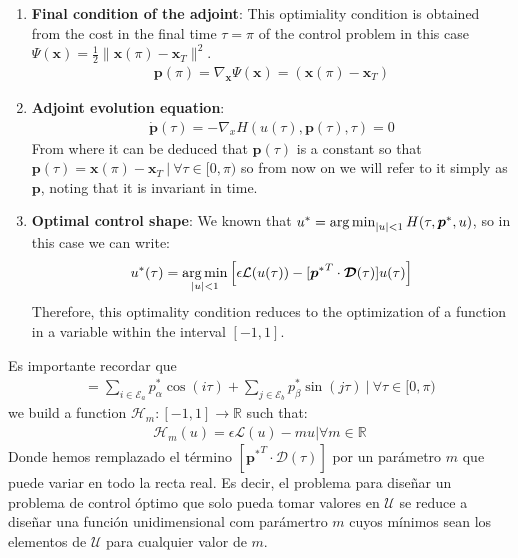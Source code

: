 \begin{enumerate}

    \item \textbf{Final condition of the adjoint}: This optimiality condition is obtained from the cost in the final time $\tau = \pi$ of the control problem in this case $ \Psi (\bm{x}) = \frac {1}{2} \| \bm{x} (\pi) - \bm{x}_T \|^2 $.
    \begin{gather}
        \bm{p}(\pi) = \nabla_{\bm{x}} \Psi(\bm{x}) =  (\bm{x} (\pi) - \bm{x}_T)
    \end{gather}
    \item \textbf{Adjoint evolution equation}: 
    \begin{gather}
        \dot{\bm{p}}(\tau) = -\nabla_x H(u(\tau),\bm{p}(\tau),\tau) = 0
    \end{gather}
    From where it can be deduced that $ \bm {p} (\tau)$ is a constant so that $ \bm {p} (\tau) = \bm {x} (\pi) - \bm { x} _T \ | \ \forall \tau \in [0, \pi) $ so from now on we will refer to it simply as $ \bm {p} $, noting that it is invariant in time.
    \item \textbf{Optimal control shape}: We known that $ u^* = \operatorname*{arg\,min}_{|u|<1} H(\tau,\bm{p}^*,u)$, so in this case we can write:
    \begin{gather}
        u^*(\tau) = \operatorname*{arg\,min}_{|u|<1}  \Big[   \epsilon \mathcal{L}(u(\tau)) -
        [{\bm{p}^*}^T \cdot \bm{\mathcal{D}}(\tau)]
        u(\tau) \Big]
    \end{gather}
    Therefore, this optimality condition reduces to the optimization of a function in a variable within the interval $ [- 1,1] $. 
\end{enumerate}
%
Es importante recordar que 
    \begin{gather}
        [{\bm{p}^*}^T \cdot \bm{\mathcal{D}}(\tau)] = \sum_{i \in \mathcal{E}_a} p^*_\alpha \cos(i\tau) + \sum_{j \in \mathcal{E}_b} p^*_\beta \sin(j\tau) \ | \ \forall \tau \in [0,\pi)
    \end{gather}
we build a function $\mathcal{H}_m: [-1,1] \rightarrow \mathbb{R}$ such that:
\begin{gather}
    \mathcal{H}_m(u) = \epsilon \mathcal{L}(u) - mu  |  \forall m \in \mathbb{R}
\end{gather}
Donde hemos remplazado el término $[{\bm{p}^*}^T \cdot \bm{\mathcal{D}}(\tau)]$ por un parámetro $m$ que puede variar en todo la recta real. Es decir, el problema para diseñar un problema de control óptimo que solo pueda tomar valores en $\mathcal{U}$ se reduce a diseñar una función unidimensional  com parámertro $m$ cuyos mínimos sean los elementos de $\mathcal{U}$ para cualquier valor de $m$. 
